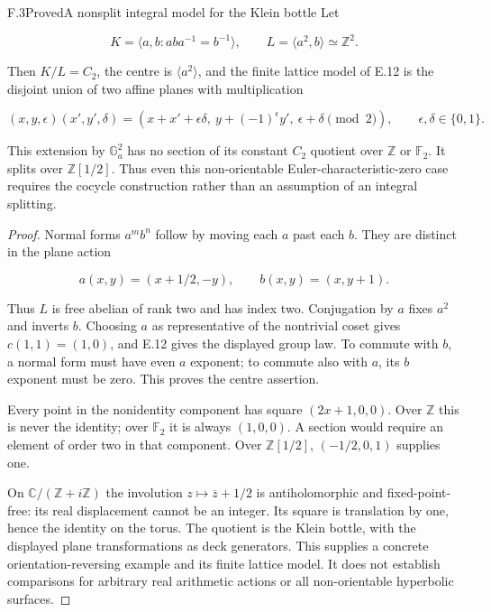 \begin{statement}{F.3}{Proved}{A nonsplit integral model for the Klein bottle}
Let

$$
K=\langle a,b:aba^{-1}=b^{-1}\rangle,\qquad
 L=\langle a^2,b\rangle\simeq\mathbb Z^2.
$$

Then $K/L=C_2$, the centre is $\langle a^2\rangle$, and the
finite lattice model of E.12 is the disjoint union of two
affine planes with multiplication

$$
(x,y,\epsilon)(x',y',\delta)=
 (x+x'+\epsilon\delta,\ y+(-1)^\epsilon y',\
       \epsilon+\delta\pmod2),
 \qquad \epsilon,\delta\in\{0,1\}.
$$

This extension by $\mathbb G_a^2$ has no section of its constant
$C_2$ quotient over $\mathbb Z$ or $\mathbb F_2$.
It splits over $\mathbb Z[1/2]$.
Thus even this non-orientable Euler-characteristic-zero case
requires the cocycle construction rather than an assumption
of an integral splitting.
\end{statement}
\begin{proof}
Normal forms $a^m b^n$ follow by moving each $a$ past each $b$.
They are distinct in the plane action

$$
a(x,y)=(x+1/2,-y),\qquad b(x,y)=(x,y+1).
$$

Thus $L$ is free abelian of rank two and has index two.
Conjugation by $a$ fixes $a^2$ and inverts $b$.
Choosing $a$ as representative of the nontrivial coset gives
$c(1,1)=(1,0)$, and E.12 gives the displayed group law.
To commute with $b$, a normal form must have even $a$ exponent;
to commute also with $a$, its $b$ exponent must be zero.
This proves the centre assertion.

Every point in the nonidentity component has square
$(2x+1,0,0)$. Over $\mathbb Z$ this is never the identity;
over $\mathbb F_2$ it is always $(1,0,0)$.
A section would require an element of order two in that
component. Over $\mathbb Z[1/2]$, $(-1/2,0,1)$ supplies one.

On $\mathbb C/(\mathbb Z+i\mathbb Z)$ the involution
$z\mapsto\overline z+1/2$ is antiholomorphic and fixed-point-free:
its real displacement cannot be an integer. Its square is
translation by one, hence the identity on the torus.
The quotient is the Klein bottle, with the displayed plane
transformations as deck generators. This supplies a concrete
orientation-reversing example and its finite lattice model.
It does not establish comparisons for arbitrary real
arithmetic actions or all non-orientable hyperbolic surfaces.
\end{proof}
